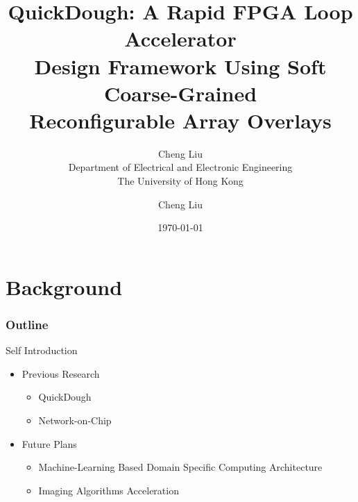 \documentclass[accentcolor=tud1a,colorbacktitle,inverttitle,landscape,german,presentation,t]{tudbeamer}
\begin{document}
\title[QuickDough]{QuickDough: A Rapid FPGA Loop Accelerator \\ Design Framework Using Soft Coarse-Grained
\\Reconfigurable Array Overlays}
\vspace{1.5ex}
\subtitle{Cheng Liu \\
    \vspace{1.5ex} Department of Electrical and Electronic
Engineering \\ The University of Hong Kong}

\author[Cheng Liu]{Cheng Liu}


\date{\today}

\begin{titleframe}
\end{titleframe}
\section{Background}

  \begin{frame}
  \frametitle{Outline}

  \item Self Introduction

  \begin{itemize}
  \setlength{\itemsep}{6pt}
  \item Previous Research
  \begin{itemize}
    \item QuickDough
    \item Network-on-Chip
  \end{itemize}

  \item Future Plans
  \begin{itemize}
    \item Machine-Learning Based Domain Specific Computing Architecture
    \item Imaging Algorithms Acceleration
  \end{itemize}

  \end{itemize}
  \end{frame}
\end{document}
